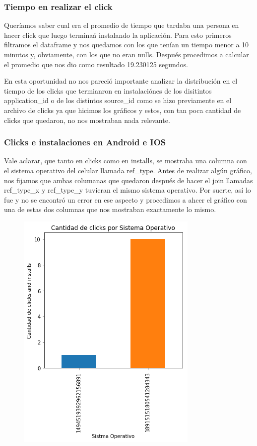 \documentclass[a4paper, 12pt]{article}
\begin{document}
{{	
	\subsubsection{Tiempo en realizar el click}
	Queríamos saber cual era el promedio de tiempo que tardaba una persona en hacer click que luego terminaá instalando la aplicación. Para esto primeros filtramos el dataframe y nos quedamos con los que tenían un tiempo menor a 10 minutos y, obviamente, con los que no eran nulls. Después procedimos a calcular el promedio que nos dio como resultado 19.230125 segundos.
	
	En esta oportunidad no nos pareció importante analizar la distribución en el tiempo de los clicks que termianron en instalaciónes de los disitintos application\_id o de los distintos source\_id como se hizo previamente en el archivo de clicks ya que hicimos los gráficos y estos, con tan poca cantidad de clicks que quedaron, no nos mostraban nada relevante.
	
	\clearpage
	\subsubsection{Clicks e instalaciones en Android e IOS}
	Vale aclarar, que tanto en clicks como en installs, se mostraba una columna con el sistema operativo del celular llamada ref\_type. Antes de realizar algún gráfico, nos fijamos que ambas columanas que quedaron después de hacer el join llamadas ref\_type\_x y ref\_type\_y tuvieran el mismo sistema operativo. Por suerte, así lo fue y no se encontró un error en ese aspecto y procedimos a ahcer el gráfico con una de estas dos columnas que nos mostraban exactamente lo mismo.
	
	
		\begin{figure}[H]
			\centering
			\includegraphics[scale = 0.7]{images/clicks-installs/ref_type.png}
			\caption{}
		\end{figure}
	

}}
\end{document}
